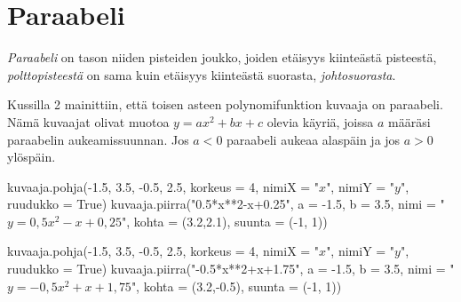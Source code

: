 \section{Paraabeli}


\emph{Paraabeli} on tason niiden pisteiden joukko, joiden etäisyys kiinteästä pisteestä, \emph{polttopisteestä} on sama kuin etäisyys kiinteästä suorasta, \emph{johtosuorasta}.

Kussilla 2 mainittiin, että toisen asteen polynomifunktion kuvaaja on paraabeli. Nämä kuvaajat olivat muotoa $y=ax^2+bx+c$ olevia käyriä, joissa $a$ määräsi paraabelin aukeamissuunnan. Jos $a<0$ paraabeli aukeaa alaspäin ja jos $a>0$ ylöspäin.

\begin{kuva}
    kuvaaja.pohja(-1.5, 3.5, -0.5, 2.5, korkeus = 4, nimiX = "$x$", nimiY = "$y$", ruudukko = True)
    kuvaaja.piirra("0.5*x**2-x+0.25", a = -1.5, b = 3.5, nimi = "$y= 0,5x^2-x+0,25$", kohta = (3.2,2.1), suunta = (-1, 1))
\end{kuva}

\begin{kuva}
    kuvaaja.pohja(-1.5, 3.5, -0.5, 2.5, korkeus = 4, nimiX = "$x$", nimiY = "$y$", ruudukko = True)
    kuvaaja.piirra("-0.5*x**2+x+1.75", a = -1.5, b = 3.5, nimi = "$y= -0,5x^2+x+1,75$", kohta = (3.2,-0.5), suunta = (-1, 1))
\end{kuva}


